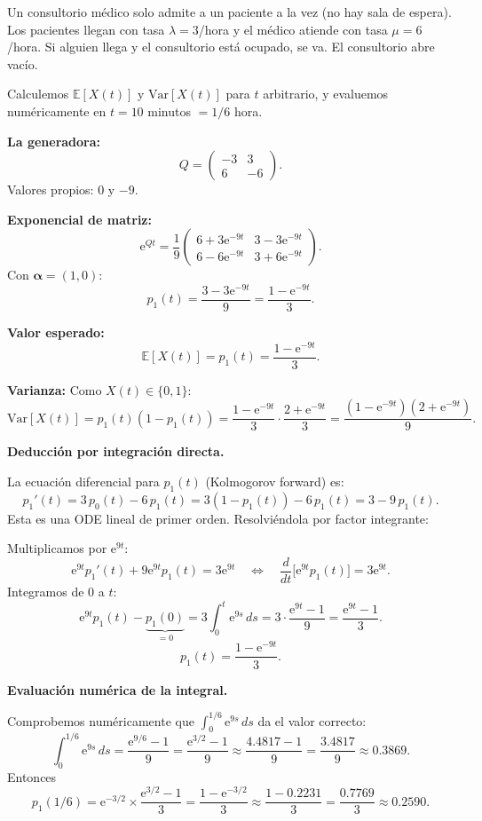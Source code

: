 \documentclass[11pt,a4paper]{article}
\theoremstyle{definition}
\theoremstyle{remark}
\newcommand{\E}{\mathbb{E}}
\newcommand{\Var}{\mathrm{Var}}
\newcommand{\e}{\mathrm{e}}
\begin{document}
\begin{ejemplo}
Un consultorio médico solo admite a un paciente a la vez (no hay sala de
espera).  Los pacientes llegan con tasa $\lambda=3$/hora y el médico
atiende con tasa $\mu=6$/hora.  Si alguien llega y el consultorio está
ocupado, se va.  El consultorio abre vacío.

Calculemos $\E[X(t)]$ y $\Var[X(t)]$ para $t$ arbitrario, y evaluemos
numéricamente en $t=10$ minutos $= 1/6$ hora.

\tcblower

\textbf{La generadora:}
\[
  Q = \begin{pmatrix}-3&3\\6&-6\end{pmatrix}.
\]
Valores propios: $0$ y $-9$.

\textbf{Exponencial de matriz:}
\[
  \e^{Qt} = \frac{1}{9}\begin{pmatrix}
    6+3\e^{-9t} & 3-3\e^{-9t} \\
    6-6\e^{-9t} & 3+6\e^{-9t}
  \end{pmatrix}.
\]
Con $\boldsymbol{\alpha}=(1,0)$:
\[
  p_1(t) = \frac{3-3\e^{-9t}}{9} = \frac{1-\e^{-9t}}{3}.
\]

\textbf{Valor esperado:}
\[
  \E[X(t)] = p_1(t) = \frac{1-\e^{-9t}}{3}.
\]

\textbf{Varianza:}
Como $X(t)\in\{0,1\}$:
\[
  \Var[X(t)] = p_1(t)(1-p_1(t))
  = \frac{1-\e^{-9t}}{3}\cdot\frac{2+\e^{-9t}}{3}
  = \frac{(1-\e^{-9t})(2+\e^{-9t})}{9}.
\]

\textbf{Deducción por integración directa.}

La ecuación diferencial para $p_1(t)$ (Kolmogorov forward) es:
\[
  p_1'(t) = 3\,p_0(t) - 6\,p_1(t) = 3(1-p_1(t)) - 6\,p_1(t)
  = 3 - 9\,p_1(t).
\]
Esta es una ODE lineal de primer orden.  Resolviéndola por factor
integrante:

Multiplicamos por $\e^{9t}$:
\[
  \e^{9t}p_1'(t) + 9\e^{9t}p_1(t) = 3\e^{9t}
  \quad\Longleftrightarrow\quad
  \frac{d}{dt}\bigl[\e^{9t}p_1(t)\bigr] = 3\e^{9t}.
\]
Integramos de $0$ a $t$:
\[
  \e^{9t}p_1(t) - \underbrace{p_1(0)}_{=0}
  = 3\int_0^t \e^{9s}\,ds
  = 3\cdot\frac{\e^{9t}-1}{9}
  = \frac{\e^{9t}-1}{3}.
\]
\[
  \boxed{p_1(t) = \frac{1-\e^{-9t}}{3}.}
\]

\textbf{Evaluación numérica de la integral.}

Comprobemos numéricamente que $\int_0^{1/6}\e^{9s}\,ds$ da el valor
correcto:
\[
  \int_0^{1/6}\e^{9s}\,ds = \frac{\e^{9/6}-1}{9} = \frac{\e^{3/2}-1}{9}
  \approx \frac{4.4817-1}{9} = \frac{3.4817}{9} \approx 0.3869.
\]
Entonces
\[
  p_1(1/6) = \e^{-3/2}\times\frac{\e^{3/2}-1}{3}
  = \frac{1-\e^{-3/2}}{3}
  \approx \frac{1-0.2231}{3} = \frac{0.7769}{3} \approx 0.2590.
\]


\end{ejemplo}
\end{document}
